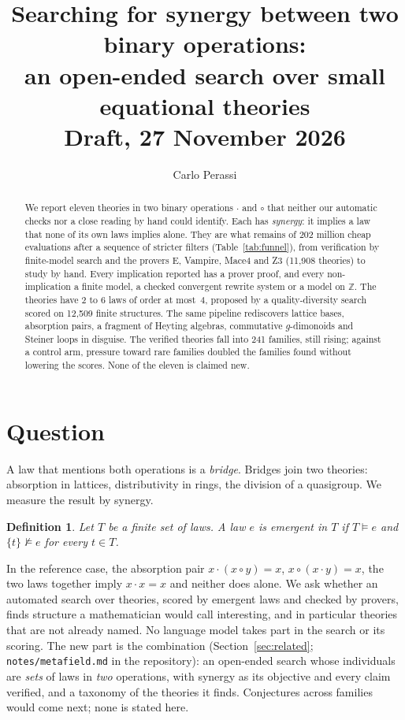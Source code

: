 \documentclass[11pt]{article}
\title{Searching for synergy between two binary operations:\\
an open-ended search over small equational theories\\[4pt]\large Draft, 27 November 2026}
\author{Carlo Perassi}
\date{}
\newcommand{\op}{\cdot}
\newcommand{\cop}{\circ}
\newtheorem{definition}{Definition}
\begin{document}
\maketitle

\begin{abstract}
We report eleven theories in two binary operations $\op$ and $\cop$ that neither our automatic checks nor a close
reading by hand could identify. Each has \emph{synergy}: it implies a law that none of its own laws implies alone.
They are what remains of 202 million cheap evaluations after a sequence of stricter filters
(Table~\ref{tab:funnel}), from verification by finite-model search and the provers E, Vampire, Mace4 and Z3 (11{,}908
theories) to study by hand. Every implication reported has a prover proof, and every non-implication a finite model,
a checked convergent rewrite system or a model on $\mathbb{Z}$. The theories have 2 to 6 laws of order at most~4,
proposed by a quality-diversity search scored on 12{,}509 finite structures. The same pipeline rediscovers lattice
bases, absorption pairs, a fragment of Heyting algebras, commutative $g$-dimonoids and Steiner loops in disguise. The
verified theories fall into 241 families, still rising; against a control arm, pressure toward rare families doubled
the families found without lowering the scores. None of the eleven is claimed new.
\end{abstract}

\section{Question}

A law that mentions both operations is a \emph{bridge}. Bridges join two theories: absorption in lattices,
distributivity in rings, the division of a quasigroup. We measure the result by synergy.

\begin{definition}
Let $T$ be a finite set of laws. A law $e$ is \emph{emergent} in $T$ if $T \models e$ and $\{t\} \not\models e$ for
every $t \in T$.
\end{definition}

In the reference case, the absorption pair $x\op(x\cop y)=x$, $x\cop(x\op y)=x$, the two laws together imply
$x\op x=x$ and neither does alone. We ask whether an automated search over theories, scored by emergent laws and
checked by provers, finds structure a mathematician would call interesting, and in particular theories that are not
already named. No language model takes part in the search or its scoring. The new part is the combination
(Section~\ref{sec:related}; \texttt{notes/metafield.md} in the repository): an open-ended search whose individuals
are \emph{sets} of laws in \emph{two} operations, with synergy as its objective and every claim verified, and a
taxonomy of the theories it finds. Conjectures across families would come next; none is stated here.
\end{document}
